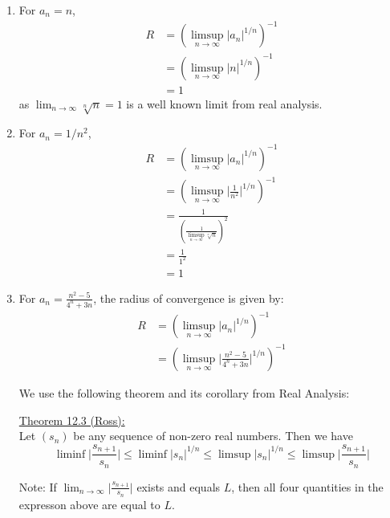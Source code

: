 \documentclass{article}
\begin{document}
\begin{enumerate}[label=(\alph*)]
  \item For $a_n = n$, 
  \begin{align*}
    R &= \left(\limsup_{n \rightarrow \infty} \lvert a_n \rvert^{1/n}\right)^{-1} \\
    &= \left(\limsup_{n \rightarrow \infty} \lvert n \rvert^{1/n}\right)^{-1} \\
    &= 1
  \end{align*}
  as $\lim_{n \rightarrow \infty} \sqrt[n]{n} = 1$ is a well known limit from real analysis.

  \vskip 0.5cm
  \item For $a_n = 1/n^2$, 
  \begin{align*}
    R &= \left(\limsup_{n \rightarrow \infty} \lvert a_n \rvert^{1/n} \right)^{-1} \\
    &= \left(\limsup_{n \rightarrow \infty} \big\lvert \frac{1}{n^2} \big\rvert^{1/n}\right)^{-1} \\
    &= \frac{1}{\left(\frac{1}{\limsup_{n \rightarrow \infty} \sqrt[n]{n}}\right)^2} \\
    &= \frac{1}{1^2} \\
    &= 1
  \end{align*}
  
  \vskip 0.5cm
  \item For $a_n = \frac{n^2 - 5}{4^n + 3n}$, the radius of convergence is given by:
  \begin{align*}
    R &= \left(\limsup_{n \rightarrow \infty} \lvert a_n \rvert^{1/n} \right)^{-1} \\
    &= \left( \limsup_{n \rightarrow \infty} \big\lvert \frac{n^2 - 5}{4^n + 3n}\big\rvert^{1/n} \right)^{-1}
  \end{align*}

  We use the following theorem and its corollary from Real Analysis:
  \begin{dottedbox}
    \underline{Theorem 12.3 (Ross):} \\
    Let $(s_n)$ be any sequence of non-zero real numbers. Then we have
    \[ \liminf \big\lvert \frac{s_{n+1}}{s_n} \big\rvert \leq \liminf \lvert s_n \rvert^{1/n} \leq \limsup \lvert s_n \rvert^{1/n} \leq \limsup \big\lvert \frac{s_{n+1}}{s_n} \big\rvert \]

    Note: If $\lim_{n \rightarrow \infty} \big\lvert \frac{s_{n+1}}{s_n } \big\rvert$ exists and equals $L$, then all four quantities in the expresson above are equal to $L$.


\end{dottedbox}
\end{enumerate}
\end{document}
